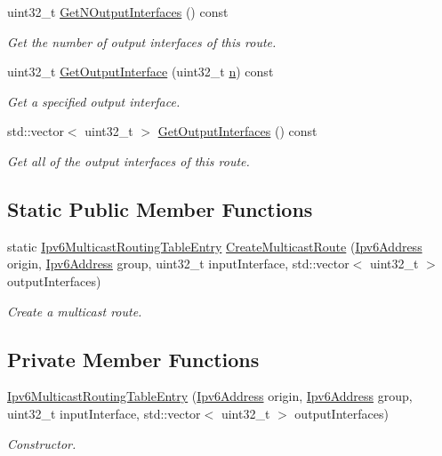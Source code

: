 \begin{DoxyCompactItemize}
uint32\+\_\+t \hyperlink{classns3_1_1Ipv6MulticastRoutingTableEntry_aa1d6f5fb4b219cd83b40920e35416009}{Get\+N\+Output\+Interfaces} () const 
\begin{DoxyCompactList}\small\item\em Get the number of output interfaces of this route. \end{DoxyCompactList}\item 
uint32\+\_\+t \hyperlink{classns3_1_1Ipv6MulticastRoutingTableEntry_a77880208422b716127e743fb3478413b}{Get\+Output\+Interface} (uint32\+\_\+t \hyperlink{lte__link__budget__x2__handover__measures_8m_abdb05bc5a064cf642a06c83b3392f148}{n}) const 
\begin{DoxyCompactList}\small\item\em Get a specified output interface. \end{DoxyCompactList}\item 
std\+::vector$<$ uint32\+\_\+t $>$ \hyperlink{classns3_1_1Ipv6MulticastRoutingTableEntry_aab08eb3614365a7feb570185fb9d2e26}{Get\+Output\+Interfaces} () const 
\begin{DoxyCompactList}\small\item\em Get all of the output interfaces of this route. \end{DoxyCompactList}\end{DoxyCompactItemize}
\subsection*{Static Public Member Functions}
\begin{DoxyCompactItemize}
\item 
static \hyperlink{classns3_1_1Ipv6MulticastRoutingTableEntry}{Ipv6\+Multicast\+Routing\+Table\+Entry} \hyperlink{classns3_1_1Ipv6MulticastRoutingTableEntry_ac82fd8a194e25b1eb30cb1a8c8ce8cff}{Create\+Multicast\+Route} (\hyperlink{classns3_1_1Ipv6Address}{Ipv6\+Address} origin, \hyperlink{classns3_1_1Ipv6Address}{Ipv6\+Address} group, uint32\+\_\+t input\+Interface, std\+::vector$<$ uint32\+\_\+t $>$ output\+Interfaces)
\begin{DoxyCompactList}\small\item\em Create a multicast route. \end{DoxyCompactList}\end{DoxyCompactItemize}
\subsection*{Private Member Functions}
\begin{DoxyCompactItemize}
\item 
\hyperlink{classns3_1_1Ipv6MulticastRoutingTableEntry_a61886faf76c968e9967b905651124e85}{Ipv6\+Multicast\+Routing\+Table\+Entry} (\hyperlink{classns3_1_1Ipv6Address}{Ipv6\+Address} origin, \hyperlink{classns3_1_1Ipv6Address}{Ipv6\+Address} group, uint32\+\_\+t input\+Interface, std\+::vector$<$ uint32\+\_\+t $>$ output\+Interfaces)
\begin{DoxyCompactList}\small\item\em Constructor. \end{DoxyCompactList}\end{DoxyCompactItemize}
